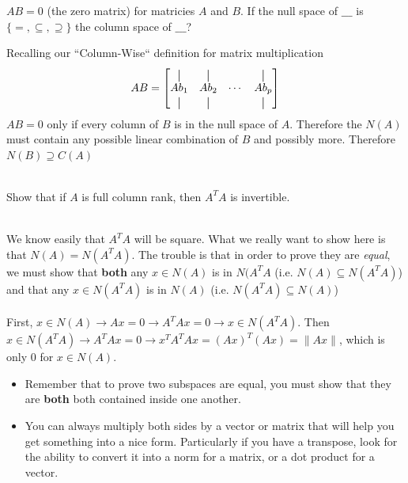 \documentclass[11pt]{article}
\newcommand*{\vertbar}{\rule[-1ex]{0.5pt}{2.5ex}}
\begin{document}
\begin{itemize}
\begin{examplebox}[1.4]\quad
\noindent $AB = 0$ (the zero matrix) for matricies $A$ and $B$. If the null space of $\_\_\_$ is $\{=, \subseteq, \supseteq \}$ the column space of $\_\_\_$?
\begin{solution}[1.4]\quad\vspace{-0.3cm}
	Recalling our ``Column-Wise`` definition for matrix multiplication
			$$AB = \begin{bmatrix}   
			  \vertbar & \vertbar &  & \vertbar\\
			Ab_{1} & Ab_{2} & \cdots & Ab_{p}\\
			  \vertbar & \vertbar &  & \vertbar
			\end{bmatrix}$$
			$AB=0$ only if every column of $B$ is in the null space of $A$. Therefore the $N(A)$ must contain any possible linear combination of $B$ and possibly more. Therefore $N(B) \supseteq C(A)$
\end{solution} 
\end{examplebox}
\begin{examplebox}[1.5]\quad \\
    \noindent Show that if $A$ is full column rank, then $A^{T}A$ is invertible.
	\begin{solution}[1.5]\quad \\
	    We know easily that $A^{T}A$ will be square. What we really want to show here is that $N(A) = N(A^{T}A)$. The trouble is that in order to prove they are \textit{equal}, we must show that \textbf{both} any $x \in N(A)$ is in $N(A^{T}A$ (i.e. $N(A) \subseteq N(A^{T}A)$) and that any $x \in N(A^{T}A)$ is in $N(A)$ (i.e. $N(A^{T}A) \subseteq N(A)$)
\\\\
		\noindent First, $x \in N(A) \to Ax = 0 \to A^{T}Ax = 0 \to x \in N(A^{T}A)$. Then $x \in N(A^{T}A) \to A^{T}Ax = 0 \to x^{T}A^{T}Ax = (Ax)^{T}(Ax) = \|Ax\|$, which is only 0 for $x \in N(A)$.
	\end{solution}
	\begin{takeaways}[1.5]\quad
	    \begin{itemize}
			\item Remember that to prove two subspaces are equal, you must show that they are \textbf{both} both contained inside one another.
			\item  You can always multiply both sides by a vector or matrix that will help you get something into a nice form. Particularly if you have a transpose, look for the ability to convert it into a norm for a matrix, or a dot product for a vector.
	    \end{itemize}
	\end{takeaways}
\end{examplebox}


\end{itemize}
\end{document}
